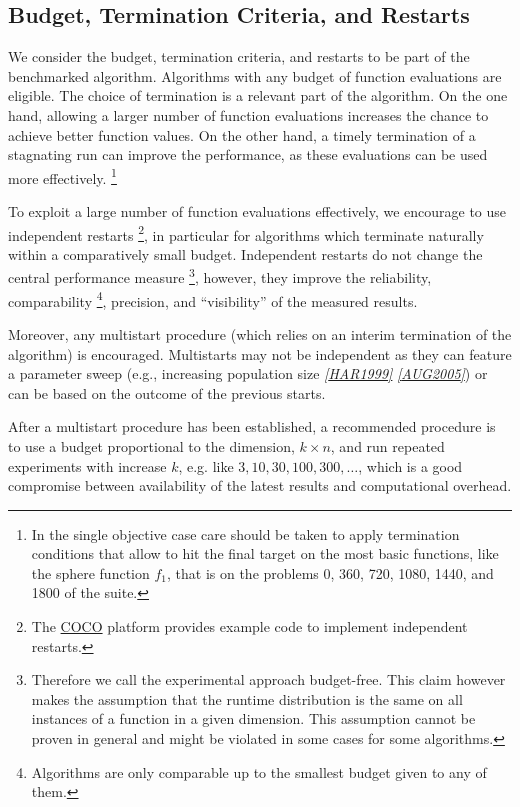 \documentclass[letterpaper,12pt,english]{article}
\begin{document}
\subsection{Budget, Termination Criteria, and Restarts}
\label{index:sec-budget}\label{index:budget-termination-criteria-and-restarts}
We consider the budget, termination criteria, and restarts to be part of the
benchmarked algorithm. Algorithms with any budget of function evaluations are eligible.
The choice of termination is a relevant part of the algorithm.
On the one hand, allowing a larger number of function evaluations increases the chance to achieve better function values. On the other hand, a timely
termination of a stagnating run can improve the performance, as these evaluations
can be used more effectively. \footnote[4]{
In the single objective case care should be
taken to apply termination conditions that allow to hit the final target on
the most basic functions, like the sphere function \(f_1\), that is on the
problems 0, 360, 720, 1080, 1440, and 1800 of the  suite.
}

To exploit a large number of function evaluations effectively, we encourage to
use independent restarts \footnote[5]{
The \href{https://github.com/numbbo/coco}{COCO} platform provides example code to implement independent restarts.
}, in particular for algorithms which terminate
naturally within a comparatively small budget. Independent restarts do not
change the central performance measure \footnote[6]{
Therefore we call the experimental approach budget-free. This claim
however makes the assumption that the runtime distribution is the same on all
instances of a function in a given dimension. This assumption cannot be
proven in general and might be violated in some cases for some algorithms.
}, however, they improve the reliability, comparability \footnote[7]{
Algorithms are only comparable up to the smallest budget given to
any of them.
}, precision, and ``visibility'' of the measured results.

Moreover, any multistart procedure (which relies on an interim termination of the algorithm) is encouraged.
Multistarts may not be independent as they can feature a parameter sweep (e.g., increasing population size \label{index:id19}{\hyperref[index:har1999]{\emph{{[}HAR1999{]}}}} \label{index:id20}{\hyperref[index:aug2005]{\emph{{[}AUG2005{]}}}}) or can be based on the outcome of the previous starts.

After a multistart procedure has been established, a recommended procedure is
to use a budget proportional to the dimension, \(k\times n\), and run
repeated experiments with increase \(k\), e.g. like
\(3, 10, 30, 100, 300,\dots\), which is a good compromise between
availability of the latest results and computational overhead.
\end{document}
